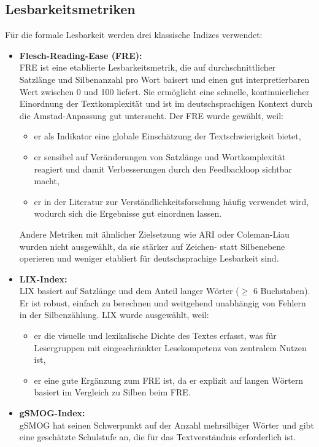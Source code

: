 \subsection{Lesbarkeitsmetriken}
Für die formale Lesbarkeit werden drei klassische Indizes verwendet:
\begin{itemize}
	\item \textbf{Flesch-Reading-Ease (FRE):}\\
	FRE ist eine etablierte Lesbarkeitsmetrik, die auf durchschnittlicher Satzlänge und Silbenanzahl pro Wort baisert und einen gut interpretierbaren Wert zwischen 0 und 100 liefert.
	Sie ermöglicht eine schnelle, kontinuierlicher Einordnung der Textkomplexität und ist im deutschsprachigen Kontext durch die Amstad-Anpassung gut untersucht.
	Der FRE wurde gewählt, weil:
	\begin{itemize}
		\item er als Indikator eine globale Einschätzung der Textschwierigkeit bietet,
		\item er sensibel auf Veränderungen von Satzlänge und Wortkomplexität reagiert und damit Verbesserungen durch den Feedbackloop sichtbar macht,
		\item er in der Literatur zur Verständlichkeitsforschung häufig verwendet wird, wodurch sich die Ergebnisse gut einordnen lassen.
	\end{itemize}
	Andere Metriken mit ähnlicher Zielsetzung wie ARI oder Coleman-Liau wurden nicht ausgewählt, da sie stärker auf Zeichen- statt Silbenebene operieren und weniger etabliert für deutschsprachige Lesbarkeit sind.
	\item \textbf{LIX-Index:}\\
	LIX basiert auf Satzlänge und dem Anteil langer Wörter ($\geq$ 6 Buchstaben).
	Er ist robust, einfach zu berechnen und weitgehend unabhängig von Fehlern in der Silbenzählung.
	LIX wurde ausgewählt, weil:
	\begin{itemize}
		\item er die visuelle und lexikalische Dichte des Textes erfasst, was für Lesergruppen mit eingeschränkter Lesekompetenz von zentralem Nutzen ist,
		\item er eine gute Ergänzung zum FRE ist, da er explizit auf langen Wörtern basiert im Vergleich zu Silben beim FRE.
	\end{itemize}
	\item \textbf{gSMOG-Index:}\\
	gSMOG hat seinen Schwerpunkt auf der Anzahl mehrsilbiger Wörter und gibt eine geschätzte Schulstufe an, die für das Textverständnis erforderlich ist.

\end{itemize}
